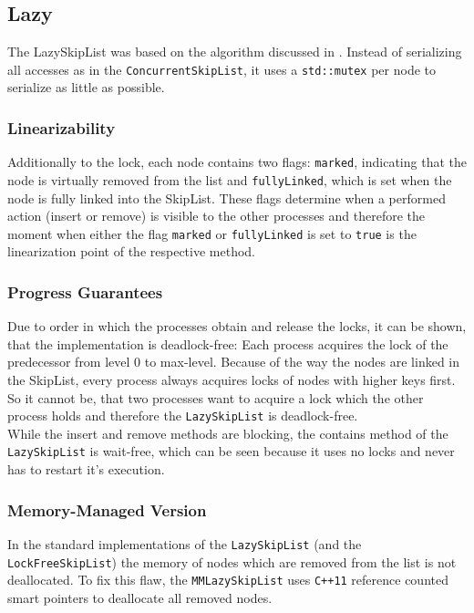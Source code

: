 \subsection{Lazy}
The LazySkipList was based on the algorithm discussed in \cite{Herlihy:2008:AMP:1734069}. Instead of serializing all accesses as in the \texttt{ConcurrentSkipList}, it uses a \texttt{std::mutex} per node to serialize as little as possible.

\subsubsection*{Linearizability}
Additionally to the lock, each node contains two flags: \texttt{marked}, indicating that the node is virtually removed from the list and \texttt{fullyLinked}, which is set when the node is fully linked into the SkipList. These flags determine when a performed action (insert or remove) is visible to the other processes and therefore the moment when either the flag \texttt{marked} or \texttt{fullyLinked} is set to \texttt{true} is the linearization point of the respective method.

\subsubsection*{Progress Guarantees}
Due to order in which the processes obtain and release the locks, it can be shown, that the implementation is deadlock-free: Each process acquires the lock of the predecessor from level 0 to max-level. Because of the way the nodes are linked in the SkipList, every process always acquires locks of nodes with higher keys first. So it cannot be, that two processes want to acquire a lock which the other process holds and therefore the \texttt{LazySkipList} is deadlock-free.\\

\noindent While the insert and remove methods are blocking, the contains method of the \texttt{LazySkipList} is wait-free, which can be seen because it uses no locks and never has to restart it's execution.

\subsubsection*{Memory-Managed Version}
In the standard implementations of the \texttt{LazySkipList} (and the \texttt{LockFreeSkipList}) the memory of nodes which are removed from the list is not deallocated. To fix this flaw, the \texttt{MMLazySkipList} uses \texttt{C++11} reference counted smart pointers to deallocate all removed nodes.

